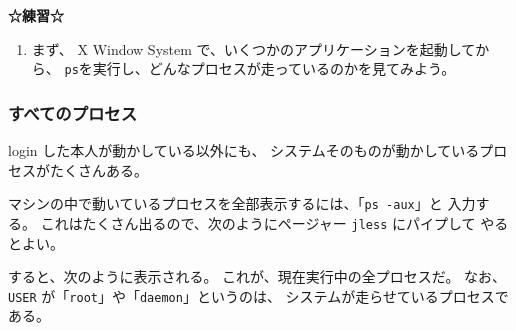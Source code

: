 \vspace*{6mm}

\begin{BOXNOTE}
{\large\bf ☆練習☆}
\begin{enumerate}
\item まず、 X Window System で、いくつかのアプリケーションを起動してから、
\texttt{ps}を実行し、どんなプロセスが走っているのかを見てみよう。
\end{enumerate}
\end{BOXNOTE}

\subsubsection{すべてのプロセス}

 login した本人が動かしている以外にも、
システムそのものが動かしているプロセスがたくさんある。

マシンの中で動いているプロセスを全部表示するには、「\texttt{ps -aux}」と
入力する。
これはたくさん出るので、次のようにページャー \texttt{jless} にパイプして
やるとよい。

\begin{progls}
\end{progls}

すると、次のように表示される。
これが、現在実行中の全プロセスだ。
なお、 \texttt{USER} が「\texttt{root}」や「\texttt{daemon}」というのは、
システムが走らせているプロセスである。

